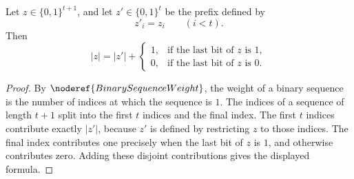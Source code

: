 \begin{helper}
Let \(z\in\{0,1\}^{t+1}\), and let \(z'\in\{0,1\}^t\) be the prefix defined by
\[
  z'_i=z_i\qquad (i<t).
\]
Then
\[
  |z|=|z'|+
  \begin{cases}
  1,&\text{if the last bit of }z\text{ is }1,\\
  0,&\text{if the last bit of }z\text{ is }0.
  \end{cases}
\]
\end{helper}
\begin{proof}
By \(\noderef{BinarySequenceWeight}\), the weight of a binary sequence is the number of indices at which the sequence is \(1\). The indices of a sequence of length \(t+1\) split into the first \(t\) indices and the final index. The first \(t\) indices contribute exactly \(|z'|\), because \(z'\) is defined by restricting \(z\) to those indices. The final index contributes one precisely when the last bit of \(z\) is \(1\), and otherwise contributes zero. Adding these disjoint contributions gives the displayed formula.
\end{proof}
